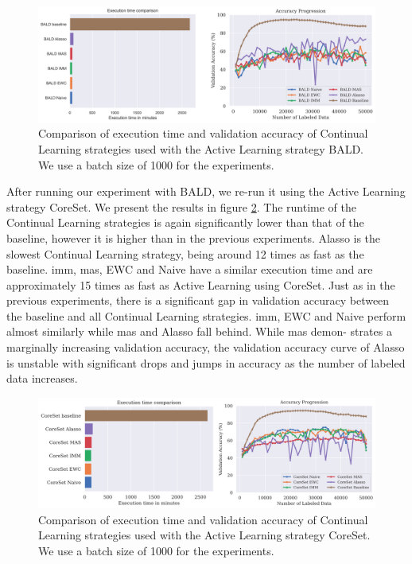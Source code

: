 \begin{figure}[h]
    \centering
    \includegraphics[width=\linewidth]{images/results_CAL/Bald_CAL_1000b.png}
    \caption[Continual Active Learning BALD 1000 batch size]{Comparison of execution time and validation accuracy of Continual Learning strategies used with the Active Learning strategy BALD.
    We use a batch size of 1000 for the experiments.}
    \label{fig:Evaluation:Results:CAL:BALD1000}
\end{figure}

After running our experiment with BALD, we re-run it using the Active Learning strategy CoreSet. We present the results in figure \ref{fig:Evaluation:Results:CAL:CoreSet1000}. The runtime of the 
Continual Learning strategies is again significantly lower than that of the baseline, however it is higher than in the previous experiments. Alasso is the slowest Continual Learning strategy, being
around 12 times as fast as the baseline. \gls{imm}, \gls{mas}, EWC and Naive have a similar execution time and are approximately 15 times as fast as Active Learning using CoreSet. Just as in the previous experiments,
there is a significant gap in validation accuracy between the baseline and all Continual Learning strategies. \gls{imm}, EWC and Naive perform almost similarly while \gls{mas} and Alasso fall behind. While \gls{mas} demon-
strates a marginally increasing validation accuracy, the validation accuracy curve of Alasso is unstable with significant drops and jumps in accuracy as the number of labeled data increases. \par

\begin{figure}[h]
    \centering
    \includegraphics[width=\linewidth]{images/results_CAL/CoreSet_CAL_1000b.png}
    \caption[Continual Active Learning CoreSet 1000 batch size]{Comparison of execution time and validation accuracy of Continual Learning strategies used with the Active Learning strategy
     CoreSet. We use a batch size of 1000 for the experiments. }
    \label{fig:Evaluation:Results:CAL:CoreSet1000}
\end{figure}

